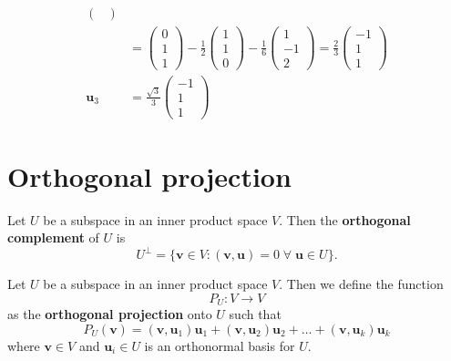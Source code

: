 \begin{example}
\begin{align*}
\begin{pmatrix}
        \end{pmatrix} 
        \\
        &= 
        \begin{pmatrix}
            0 \\ 1 \\ 1
        \end{pmatrix}
        - \frac 1 2
        \begin{pmatrix}
            1 \\ 1 \\ 0
        \end{pmatrix}
        - \frac 1 6
        \begin{pmatrix}
            1 \\ -1 \\ 2
        \end{pmatrix}
        =
        \frac 2 3
        \begin{pmatrix}
            -1 \\ 1 \\ 1
        \end{pmatrix}
        \\
        \bm u_3 &= \frac{\sqrt 3}{3}
        \begin{pmatrix}
            -1 \\ 1 \\ 1
        \end{pmatrix}
    \end{align*}
\end{example}

\section{Orthogonal projection}

\begin{definition}
    Let $U$ be a subspace in an inner product space $V$. Then the \textbf{orthogonal complement} of $U$ is \[ U^{\perp} = \{ \bm v \in V : (\bm v, \bm u) = 0 \; \forall \; \bm u \in U \}. \]
\end{definition}

\begin{definition}
    Let $U$ be a subspace in an inner product space $V$. Then we define the function \[ P_U : V \to V \] as the \textbf{orthogonal projection} onto $U$ such that \[ P_U(\bm v) = (\bm v, \bm u_1) \bm u_1 + (\bm v, \bm u_2) \bm u_2 + \ldots + (\bm v, \bm u_k) \bm u_k \] where $\bm v \in V$ and $\bm u_i \in U$ is an orthonormal basis for $U$.
\end{definition}

